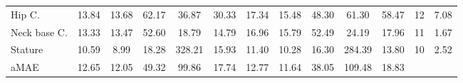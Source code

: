 \begin{table*}[t!]
\begin{center}
\begin{tabular}{|l|c|c||c|c|c||c|c||c|c|c|c|c|}
Hip C.                  & 13.84   & 13.68   & 62.17     & 36.87 & 30.33         & 17.34   & 15.48   & 48.30 & 61.30     & 58.47     & 12  &   7.08    \\
Neck base C.            & 13.33   & 13.47   & 52.60     & 18.79 & 14.79         & 16.96   & 15.79   & 52.49 & 24.19     & 17.96     & 11  &    1.67   \\
Stature                 & 10.59   & 8.99    & 18.28     & 328.21 & 15.93         & 11.40   & 10.28   & 16.30 & 284.39     & 13.80     & 10  &    2.52   \\ \hline \hline
aMAE                    & 12.65   & 12.05   & 49.32     & 99.86 & 17.74         & 12.77   & 11.64   & 38.05 & 109.48     & 18.83     &   \multicolumn{2}{c}{}  \\    \cline{1-11}  
\end{tabular}
\end{center}
\end{table*}